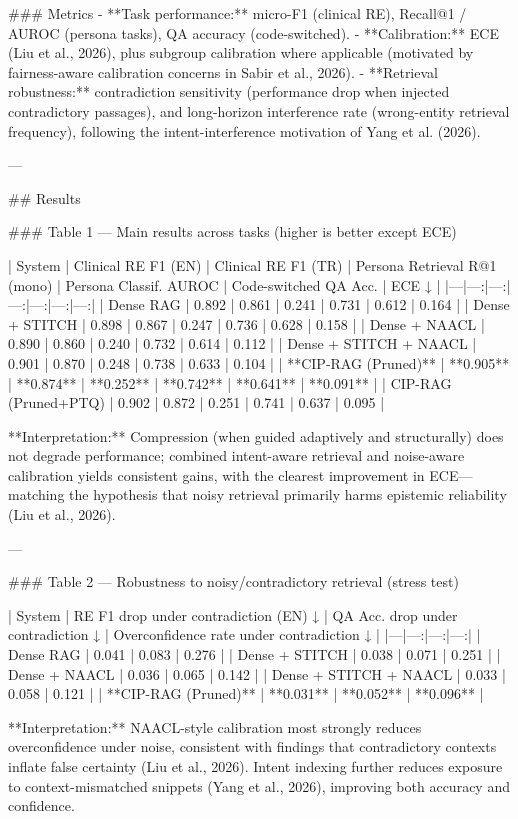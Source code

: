 ### Metrics  
- **Task performance:** micro-F1 (clinical RE), Recall@1 / AUROC (persona tasks), QA accuracy (code-switched).  
- **Calibration:** ECE (Liu et al., 2026), plus subgroup calibration where applicable (motivated by fairness-aware calibration concerns in Sabir et al., 2026).  
- **Retrieval robustness:** contradiction sensitivity (performance drop when injected contradictory passages), and long-horizon interference rate (wrong-entity retrieval frequency), following the intent-interference motivation of Yang et al. (2026).  

---

## Results  

### Table 1 — Main results across tasks (higher is better except ECE)  

| System | Clinical RE F1 (EN) | Clinical RE F1 (TR) | Persona Retrieval R@1 (mono) | Persona Classif. AUROC | Code-switched QA Acc. | ECE ↓ |
|---|---:|---:|---:|---:|---:|---:|
| Dense RAG | 0.892 | 0.861 | 0.241 | 0.731 | 0.612 | 0.164 |
| Dense + STITCH | 0.898 | 0.867 | 0.247 | 0.736 | 0.628 | 0.158 |
| Dense + NAACL | 0.890 | 0.860 | 0.240 | 0.732 | 0.614 | 0.112 |
| Dense + STITCH + NAACL | 0.901 | 0.870 | 0.248 | 0.738 | 0.633 | 0.104 |
| **CIP-RAG (Pruned)** | **0.905** | **0.874** | **0.252** | **0.742** | **0.641** | **0.091** |
| CIP-RAG (Pruned+PTQ) | 0.902 | 0.872 | 0.251 | 0.741 | 0.637 | 0.095 |

**Interpretation:** Compression (when guided adaptively and structurally) does not degrade performance; combined intent-aware retrieval and noise-aware calibration yields consistent gains, with the clearest improvement in ECE—matching the hypothesis that noisy retrieval primarily harms epistemic reliability (Liu et al., 2026).

---

### Table 2 — Robustness to noisy/contradictory retrieval (stress test)  

| System | RE F1 drop under contradiction (EN) ↓ | QA Acc. drop under contradiction ↓ | Overconfidence rate under contradiction ↓ |
|---|---:|---:|---:|
| Dense RAG | 0.041 | 0.083 | 0.276 |
| Dense + STITCH | 0.038 | 0.071 | 0.251 |
| Dense + NAACL | 0.036 | 0.065 | 0.142 |
| Dense + STITCH + NAACL | 0.033 | 0.058 | 0.121 |
| **CIP-RAG (Pruned)** | **0.031** | **0.052** | **0.096** |

**Interpretation:** NAACL-style calibration most strongly reduces overconfidence under noise, consistent with findings that contradictory contexts inflate false certainty (Liu et al., 2026). Intent indexing further reduces exposure to context-mismatched snippets (Yang et al., 2026), improving both accuracy and confidence.


